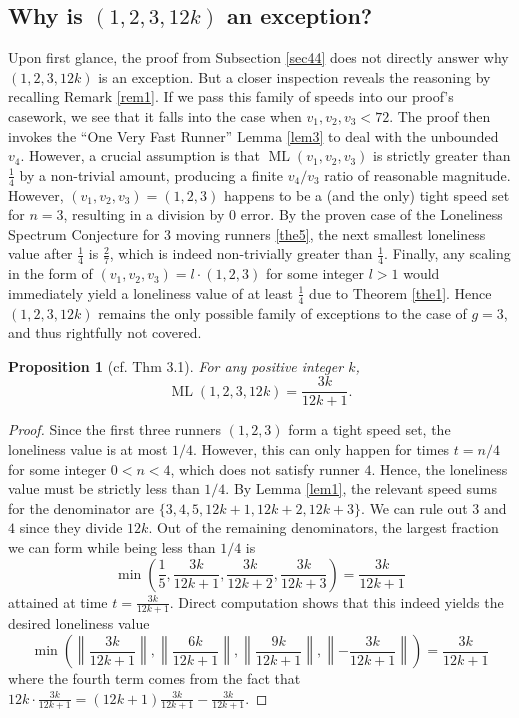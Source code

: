 \documentclass[11pt]{amsart}
\newtheorem{prop}{Proposition}[section]
\newcommand{\Norm}[1]{\left\lVert #1 \right\rVert}
\DeclareMathOperator{\ML}{ML}
\begin{document}
\subsection{Why is $(1,2,3,12k)$ an exception?}
Upon first glance, the proof from Subsection \ref{sec44} does not directly answer why $(1,2,3,12k)$ is an exception. But a closer inspection reveals the reasoning by recalling Remark \ref{rem1}. If we pass this family of speeds into our proof's casework, we see that it falls into the case when $v_1,v_2,v_3 < 72$. The proof then invokes the ``One Very Fast Runner'' Lemma \ref{lem3} to deal with the unbounded $v_4$. However, a crucial assumption is that $\ML(v_1,v_2,v_3)$ is strictly greater than $\frac{1}{4}$ by a non-trivial amount, producing a finite $v_4 / v_3$ ratio of reasonable magnitude. However, $(v_1,v_2,v_3) = (1,2,3)$ happens to be a (and the only) tight speed set for $n = 3$, resulting in a division by $0$ error. By the proven case of the Loneliness Spectrum Conjecture for $3$ moving runners \ref{the5}, the next smallest loneliness value after $\frac{1}{4}$ is $\frac{2}{7}$, which is indeed non-trivially greater than $\frac{1}{4}$. Finally, any scaling in the form of $(v_1,v_2,v_3) = l \cdot (1,2,3)$ for some integer $l > 1$ would immediately yield a loneliness value of at least $\frac{1}{4}$ due to Theorem \ref{the1}. Hence $(1,2,3,12k)$ remains the only possible family of exceptions to the case of $g = 3$, and thus rightfully not covered.

\begin{prop}[cf. \cite{kravitz} Thm 3.1]
    \label{prop1}
    For any positive integer $k$,
    $$\ML(1, 2, 3, 12k) = \frac{3k}{12k + 1}.$$
\end{prop}

\begin{proof}
    Since the first three runners $(1, 2, 3)$ form a tight speed set, the loneliness value is at most $1/4$. However, this can only happen for times $t = n / 4$ for some integer $0 < n < 4$, which does not satisfy runner $4$. Hence, the loneliness value must be strictly less than $1/4$. By Lemma \ref{lem1}, the relevant speed sums for the denominator are $\{3, 4, 5, 12k + 1, 12k + 2, 12k + 3\}$. We can rule out $3$ and $4$ since they divide $12k$. Out of the remaining denominators, the largest fraction we can form while being less than $1/4$ is
    $$\min\left(\frac{1}{5}, \frac{3k}{12k+1}, \frac{3k}{12k+2}, \frac{3k}{12k+3}\right) = \frac{3k}{12k + 1}$$
    attained at time $t = \frac{3k}{12k + 1}$. Direct computation shows that this indeed yields the desired loneliness value
    $$\min\left(\Norm{\frac{3k}{12k+1}}, \Norm{\frac{6k}{12k + 1}}, \Norm{\frac{9k}{12k + 1}}, \Norm{-\frac{3k}{12k + 1}}\right) = \frac{3k}{12k + 1} $$
    where the fourth term comes from the fact that $12k \cdot \frac{3k}{12k + 1} = (12k + 1)\frac{3k}{12k + 1} - \frac{3k}{12k + 1}$.
\end{proof}
\end{document}
